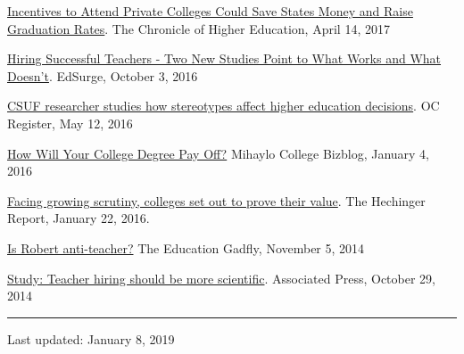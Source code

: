 \documentclass[11pt,a4paper]{article}
\begin{document}
\begin{hangparas}{.25in}{1}
\href{http://www.chronicle.com/article/Incentives-to-Attend-Private/239801?cid=at\&utm_source=at\&utm_medium=en\&elqTrackId=5719cd9ce29549cf9b399520678c52f0\&elq=c46d8f380cc14466861c12899b770d6c\&elqaid=13488\&elqat=1\&elqCampaignId=5599}{Incentives to Attend Private Colleges Could Save States Money and Raise Graduation Rates}. The Chronicle of Higher Education, April 14, 2017



\href{https://www.edsurge.com/news/2016-10-03-hiring-successful-teachers-two-new-studies-point-to-what-works-and-what-doesn-t}{Hiring Successful Teachers - Two New Studies Point to What Works and What Doesn't}. EdSurge, October 3, 2016



\href{http://www.ocregister.com/articles/college-715504-students-klein.html}{CSUF researcher studies how stereotypes affect higher education decisions}. OC Register, May 12, 2016



\href{https://bizblogs.fullerton.edu/blog/2016/01/04/how-will-your-college-degree-pay-off/}{How Will Your College Degree Pay Off?} Mihaylo College Bizblog, January 4, 2016



\href{http://hechingerreport.org/25399-2/}{Facing growing scrutiny, colleges set out to prove their value}. The Hechinger Report, January 22, 2016.



\href{https://edexcellence.net/commentary/podcasts/is-robert-anti-teacher}{Is Robert anti-teacher?} The Education Gadfly, November 5, 2014



\href{http://komonews.com/news/local/study-teacher-hiring-should-be-more-scientific}{Study: Teacher hiring should be more scientific}. Associated Press, October 29, 2014

 

\end{hangparas}

\vspace{1cm} \hrule \vspace{1cm}





Last updated: January 8, 2019
\end{document}
